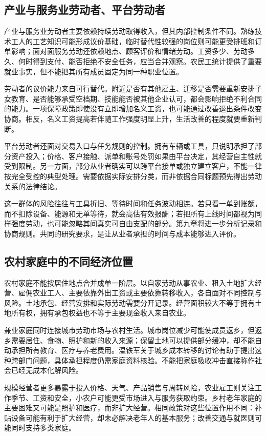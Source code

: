 \documentclass[UTF8,fontset=fandol,zihao=-4,oneside,openany]{ctexbook}
\begin{document}
\subsection{产业与服务业劳动者、平台劳动者}
产业与服务业劳动者主要依赖持续劳动取得收入，但其内部控制条件不同。熟练技术工人的工艺知识可能形成议价基础，临时替代性较强的岗位则可能更受排班和订单影响；面对面服务劳动还依赖地点、顾客评价和情绪劳动。工资多少、劳动多久、何时得到支付、能否拒绝不安全任务，应当合并观察。农民工统计提供了重要就业事实，但不能把其所有成员固定为同一种职业位置。\cite{Migrant2025}

劳动者的议价能力来自可行替代。附近是否有其他雇主、迁移是否需要重新安排子女教育、是否能够承受空档期、技能能否被其他企业认可，都会影响拒绝不利合同的能力。一项保障政策即使没有立即增加名义工资，也可能通过改善退出条件改变协商。相反，名义工资提高若伴随工作强度明显上升，生活改善的程度就要重新判断。

平台劳动者还面对交易入口与任务规则的控制。拥有车辆或工具，只说明承担了部分资产投入；价格、客户接触、派单和账号处罚如果由平台决定，其经营自主性就受到限制。另一方面，部分从业者确实可以跨平台接单或独立建立客户，不能一律按完全受控的典型处理。需要依据实际安排分类，而非依据合同标题预先得出劳动关系的法律结论。

这一群体的风险往往与工具折旧、等待时间和任务波动相连。若只看一单到账额，而不扣除设备、能源和无单等待，就会高估有效报酬；若把所有上线时间都视为同样强度劳动，也可能忽略其间真实可自由支配的部分。第九章将进一步分析记录和协商规则。共同的研究要求，是让从业者承担的时间与成本能够进入评价。

\subsection{农村家庭中的不同经济位置}
农村家庭不能按居住地点合并成单一阶层。以自家劳动从事农业、租入土地扩大经营、雇佣农业工人、主要依靠外出工资或主要依靠转移收入，各自面对不同控制与风险。土地承包、经营安排和实际劳动需要分开记录。经营面积较大不等于拥有土地所有权，拥有承包权益也不等于主要现金收入来自农业。

兼业家庭同时连接城市劳动市场与农村生活。城市岗位减少可能使成员返乡，但返乡需要居住、食物、照护和新的收入来源；保留土地可以提供部分缓冲，却不能自动承担所有教育、医疗与养老费用。温铁军关于城乡成本转移的讨论有助于提出这种跨部门问题，具体承担程度仍需家庭资料核验。不能把家庭吸收冲击直接称作社会已经无成本化解风险。\cite{Wen2021}

规模经营者更多暴露于投入价格、天气、产品销售与周转风险，农业雇工则关注工作季节、工资和安全，小农户可能更受市场进入与服务获取约束。乡村老年家庭的主要困难又可能是照护和医疗，而非扩大经营。相同政策对这些位置作用不同：补贴设备可能有利于扩大经营，却未必解决老年人的基本服务；改善交通与就医则可能同时支持多类家庭。
\end{document}
